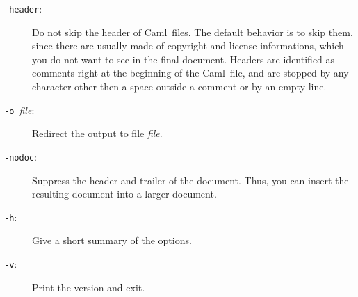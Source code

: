 \documentclass[12pt]{article}
\newcommand{\Caml}{\textsf{Caml}}
\begin{document}
\begin{description}

\item[\texttt{-header}:]

  Do not skip the header of \Caml\ files. The default behavior is to
  skip them, since there are usually made of copyright and license
  informations, which you do not want to see in the final document.
  Headers are identified as comments right at the beginning of the
  \Caml\ file, and are stopped by any character other then a space
  outside a comment or by an empty line. 

\item[\texttt{-o }\textit{file}:] 
  
  Redirect the output to file \textit{file}.

\item[\texttt{-nodoc}:]

  Suppress the header and trailer of the document. Thus, you can
  insert the resulting document into a larger document.

\item[\texttt{-h}:]

  Give a short summary of the options.

\item[\texttt{-v}:]

  Print the version and exit.

\end{description}

\end{document}
